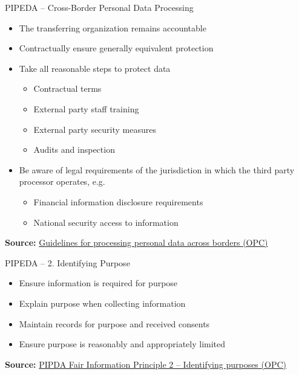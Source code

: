 \documentclass[ignorenonframetext,xcolor=x11names]{beamer}
\begin{document}
\begin{frame}{PIPEDA -- Cross-Border Personal Data Processing}
\begin{itemize}
   \item The transferring organization remains accountable
   \item Contractually ensure generally equivalent protection
   \item Take all reasonable steps to protect data
   \begin{itemize}
      \item Contractual terms
      \item External party staff training
      \item External party security measures
      \item Audits and inspection
   \end{itemize}
   \item Be aware of legal requirements of the jurisdiction in which the third party processor operates, e.g. 
   \begin{itemize}
      \item Financial information disclosure requirements
      \item National security access to information
   \end{itemize}
\end{itemize}

\vspace{\baselineskip}
\scriptsize \textbf{Source:} \href{https://www.priv.gc.ca/en/privacy-topics/airports-and-borders/gl_dab_090127/}{Guidelines for processing personal data across borders (OPC)}
\end{frame}

\begin{frame}{PIPEDA -- 2. Identifying Purpose}
\begin{itemize}
   \item Ensure information is required for purpose
   \item Explain purpose when collecting information
   \item Maintain records for purpose and received consents
   \item Ensure purpose is reasonably and appropriately limited
\end{itemize}

\vspace{\baselineskip}
\scriptsize \textbf{Source:} \href{https://www.priv.gc.ca/en/privacy-topics/privacy-laws-in-canada/the-personal-information-protection-and-electronic-documents-act-pipeda/p_principle/principles/p_purposes/}{PIPDA Fair Information Principle 2 -- Identifying purposes (OPC)}
\end{frame}
\end{document}

